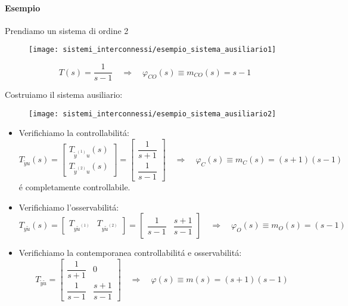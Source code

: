 \documentclass[../main.tex]{subfiles}
\begin{document}
		\begin{mdframed}[style=Esempio]
			\paragraph{Esempio}
				Prendiamo un sistema di ordine 2
				\begin{figure}[H]
					\centering\texttt{[image: sistemi\_interconnessi/esempio\_sistema\_ausiliario1]}
				\end{figure}
				\[
					T(s) = \dfrac{1}{s-1} \quad\Rightarrow\quad \varphi_{CO}(s) \equiv m_{CO}(s) = s-1
				\]
				
				Costruiamo il sistema ausiliario:
				\begin{figure}[H]
					\centering\texttt{[image: sistemi\_interconnessi/esempio\_sistema\_ausiliario2]}
				\end{figure}
				\begin{itemize}
					\item 
						Verifichiamo la controllabilit\'a:
						\[
							T_{\tilde yu}(s) =
							\begin{bmatrix}
								T_{\tilde y^{(1)}u}(s)
								\\[1.5em]
								T_{\tilde y^{(2)}u}(s)
							\end{bmatrix} =
							\begin{bmatrix}
								\dfrac{1}{s+1}
								\\[1em]
								\dfrac{1}{s-1}
							\end{bmatrix}
							\quad\Rightarrow\quad
							\varphi_C(s) \equiv m_C(s) = (s+1)(s-1)
						\]
						\'e completamente controllabile.
					\item 
						Verifichiamo l'osservabilit\'a:
						\[
							T_{y \tilde u}(s) = 
							\begin{bmatrix}
								T_{y \tilde u^{(1)}} & T_{y \tilde u^{(2)}}
							\end{bmatrix} =
							\begin{bmatrix}
								\dfrac{1}{s-1} & \dfrac{s+1}{s-1}
							\end{bmatrix}
							\quad\Rightarrow\quad
							\varphi_O(s) \equiv m_O(s) = (s-1)
						\]
					\item 
						Verifichiamo la contemporanea controllabilit\'a e osservabilit\'a:
						\[
							T_{\tilde y \tilde u} =
							\begin{bmatrix}
								\dfrac{1}{s+1} & 0\\
								\dfrac{1}{s-1} & \dfrac{s+1}{s-1}
							\end{bmatrix}
							\quad\Rightarrow\quad
							\varphi(s) \equiv m(s) = (s+1)(s-1)
						\]
				\end{itemize}
		\end{mdframed}
	
\end{document}
